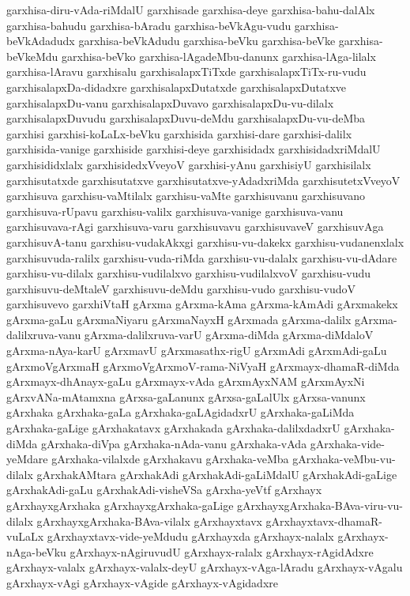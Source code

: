 {garxhisa-diru-vAda-riMdalU
garxhisade
garxhisa-deye
garxhisa-bahu-dalAlx
garxhisa-bahudu
garxhisa-bAradu
garxhisa-beVkAgu-vudu
garxhisa-beVkAdadudx
garxhisa-beVkAdudu
garxhisa-beVku
garxhisa-beVke
garxhisa-beVkeMdu
garxhisa-beVko
garxhisa-lAgadeMbu-danunx
garxhisa-lAga-lilalx
garxhisa-lAravu
garxhisalu
garxhisalapxTiTxde
garxhisalapxTiTx-ru-vudu
garxhisalapxDa-didadxre
garxhisalapxDutatxde
garxhisalapxDutatxve
garxhisalapxDu-vanu
garxhisalapxDuvavo
garxhisalapxDu-vu-dilalx
garxhisalapxDuvudu
garxhisalapxDuvu-deMdu
garxhisalapxDu-vu-deMba
garxhisi
garxhisi-koLaLx-beVku
garxhisida
garxhisi-dare
garxhisi-dalilx
garxhisida-vanige
garxhiside
garxhisi-deye
garxhisidadx
garxhisidadxriMdalU
garxhisididxlalx
garxhisidedxVveyoV
garxhisi-yAnu
garxhisiyU
garxhisilalx
garxhisutatxde
garxhisutatxve
garxhisutatxve-yAdadxriMda
garxhisutetxVveyoV
garxhisuva
garxhisu-vaMtilalx
garxhisu-vaMte
garxhisuvanu
garxhisuvano
garxhisuva-rUpavu
garxhisu-valilx
garxhisuva-vanige
garxhisuva-vanu
garxhisuvava-rAgi
garxhisuva-varu
garxhisuvavu
garxhisuvaveV
garxhisuvAga
garxhisuvA-tanu
garxhisu-vudakAkxgi
garxhisu-vu-dakekx
garxhisu-vudanenxlalx
garxhisuvuda-ralilx
garxhisu-vuda-riMda
garxhisu-vu-dalalx
garxhisu-vu-dAdare
garxhisu-vu-dilalx
garxhisu-vudilalxvo
garxhisu-vudilalxvoV
garxhisu-vudu
garxhisuvu-deMtaleV
garxhisuvu-deMdu
garxhisu-vudo
garxhisu-vudoV
garxhisuvevo
garxhiVtaH
gArxma
gArxma-kAma
gArxma-kAmAdi
gArxmakekx
gArxma-gaLu
gArxmaNiyaru
gArxmaNayxH
gArxmada
gArxma-dalilx
gArxma-dalilxruva-vanu
gArxma-dalilxruva-varU
gArxma-diMda
gArxma-diMdaloV
gArxma-nAya-karU
gArxmavU
gArxmasathx-rigU
gArxmAdi
gArxmAdi-gaLu
gArxmoVgArxmaH
gArxmoVgArxmoV-rama-NiVyaH
gArxmayx-dhamaR-diMda
gArxmayx-dhAnayx-gaLu
gArxmayx-vAda
gArxmAyxNAM
gArxmAyxNi
gArxvANa-mAtamxna
gArxsa-gaLanunx
gArxsa-gaLalUlx
gArxsa-vanunx
gArxhaka
gArxhaka-gaLa
gArxhaka-gaLAgidadxrU
gArxhaka-gaLiMda
gArxhaka-gaLige
gArxhakatavx
gArxhakada
gArxhaka-dalilxdadxrU
gArxhaka-diMda
gArxhaka-diVpa
gArxhaka-nAda-vanu
gArxhaka-vAda
gArxhaka-vide-yeMdare
gArxhaka-vilalxde
gArxhakavu
gArxhaka-veMba
gArxhaka-veMbu-vu-dilalx
gArxhakAMtara
gArxhakAdi
gArxhakAdi-gaLiMdalU
gArxhakAdi-gaLige
gArxhakAdi-gaLu
gArxhakAdi-visheVSa
gArxha-yeVtf
gArxhayx
gArxhayxgArxhaka
gArxhayxgArxhaka-gaLige
gArxhayxgArxhaka-BAva-viru-vu-dilalx
gArxhayxgArxhaka-BAva-vilalx
gArxhayxtavx
gArxhayxtavx-dhamaR-vuLaLx
gArxhayxtavx-vide-yeMdudu
gArxhayxda
gArxhayx-nalalx
gArxhayx-nAga-beVku
gArxhayx-nAgiruvudU
gArxhayx-ralalx
gArxhayx-rAgidAdxre
gArxhayx-valalx
gArxhayx-valalx-deyU
gArxhayx-vAga-lAradu
gArxhayx-vAgalu
gArxhayx-vAgi
gArxhayx-vAgide
gArxhayx-vAgidadxre
}
